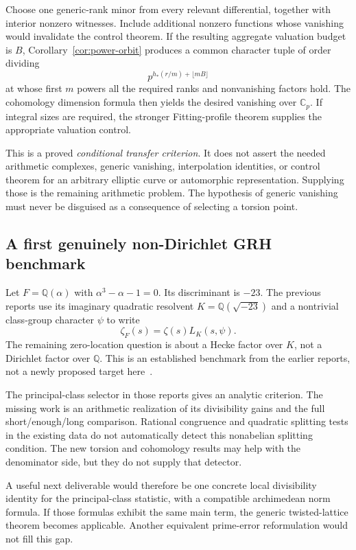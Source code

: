 \documentclass[11pt,letterpaper]{article}
\theoremstyle{remark}
\newcommand{\Q}{\mathbb Q}
\newcommand{\C}{\mathbb C}
\begin{document}
Choose one generic-rank minor from every relevant differential, together
with interior nonzero witnesses. Include additional nonzero functions
whose vanishing would invalidate the control theorem. If the resulting
aggregate valuation budget is $B$, Corollary~\ref{cor:power-orbit} produces
a common character tuple of order dividing
\[
 p^{h_*(r/m)+\lfloor mB\rfloor}
\]
at whose first $m$ powers all the required ranks and nonvanishing factors
hold. The cohomology dimension formula then yields the desired vanishing
over $\C_p$. If integral sizes are required, the stronger
Fitting-profile theorem supplies the appropriate valuation control.

This is a proved \emph{conditional transfer criterion}. It does not assert
the needed arithmetic complexes, generic vanishing, interpolation
identities, or control theorem for an arbitrary elliptic curve or
automorphic representation. Supplying those is the remaining arithmetic
problem. The hypothesis of generic vanishing must never be disguised as a
consequence of selecting a torsion point.

\subsection{A first genuinely non-Dirichlet GRH benchmark}

Let $F=\Q(\alpha)$ with $\alpha^3-\alpha-1=0$. Its discriminant is $-23$.
The previous reports use its imaginary quadratic resolvent
$K=\Q(\sqrt{-23})$ and a nontrivial class-group character $\psi$ to write
\[
 \zeta_F(s)=\zeta(s)L_K(s,\psi).
\]
The remaining zero-location question is about a Hecke factor over $K$,
not a Dirichlet factor over $\Q$. This is an established benchmark from
the earlier reports, not a newly proposed target here~\cite{incoming}.

The principal-class selector in those reports gives an analytic criterion.
The missing work is an arithmetic realization of its divisibility gains
and the full short/enough/long comparison. Rational congruence and quadratic
splitting tests in the existing data do not automatically detect this
nonabelian splitting condition. The new torsion and cohomology results may
help with the denominator side, but they do not supply that detector.

A useful next deliverable would therefore be one concrete local
divisibility identity for the principal-class statistic, with a compatible
archimedean norm formula. If those formulas exhibit the same main term,
the generic twisted-lattice theorem becomes applicable. Another
equivalent prime-error reformulation would not fill this gap.
\end{document}
